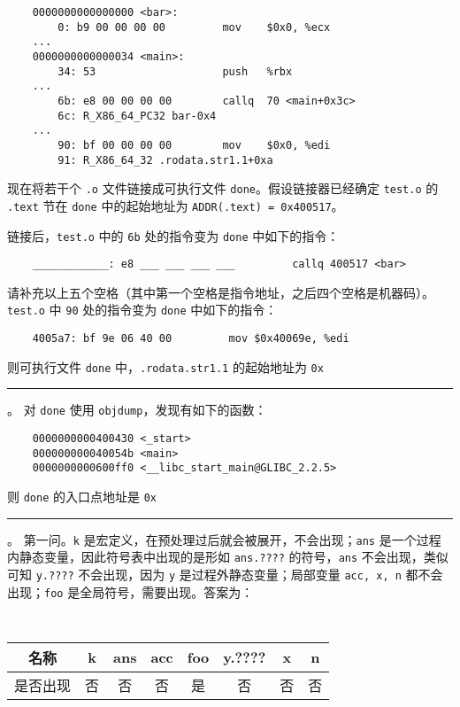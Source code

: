 \begin{problems}
        \begin{verbatim}
    0000000000000000 <bar>:
        0: b9 00 00 00 00         mov    $0x0, %ecx
    ...
    0000000000000034 <main>:
        34: 53                    push   %rbx
    ...
        6b: e8 00 00 00 00        callq  70 <main+0x3c>
        6c: R_X86_64_PC32 bar-0x4
    ...
        90: bf 00 00 00 00        mov    $0x0, %edi
        91: R_X86_64_32 .rodata.str1.1+0xa
        \end{verbatim}
        现在将若干个 \verb|.o| 文件链接成可执行文件 \verb|done|。假设链接器已经确定 \verb|test.o| 的 \verb|.text| 节在 \verb|done| 中的起始地址为 \verb|ADDR(.text) = 0x400517|。

        \subqn 链接后，\verb|test.o| 中的 \verb|6b| 处的指令变为 \verb|done| 中如下的指令：
        \begin{verbatim}
    ____________: e8 ___ ___ ___ ___         callq 400517 <bar>
        \end{verbatim}
        请补充以上五个空格（其中第一个空格是指令地址，之后四个空格是机器码）。
        \subqn \verb|test.o| 中 \verb|90| 处的指令变为 \verb|done| 中如下的指令：
        \begin{verbatim}
    4005a7: bf 9e 06 40 00         mov $0x40069e, %edi
        \end{verbatim}
        则可执行文件 \verb|done| 中，\verb|.rodata.str1.1| 的起始地址为 \verb|0x|\rule{2.5cm}{0.25mm}。
        \qn 对 \verb|done| 使用 \verb|objdump|，发现有如下的函数：
        \begin{verbatim}
    0000000000400430 <_start>
    000000000040054b <main>
    0000000000600ff0 <__libc_start_main@GLIBC_2.2.5>
        \end{verbatim}
        则 \verb|done| 的入口点地址是 \verb|0x|\rule{2.5cm}{0.25mm}。
        \sol 第一问。\verb|k| 是宏定义，在预处理过后就会被展开，不会出现；\verb|ans| 是一个过程内静态变量，因此符号表中出现的是形如 \verb|ans.????| 的符号，\verb|ans| 不会出现，类似可知 \verb|y.????| 不会出现，因为 \verb|y| 是过程外静态变量；局部变量 \verb|acc, x, n| 都不会出现；\verb|foo| 是全局符号，需要出现。答案为：
        \begin{table}[H]
            \tt
            \centering
            \begin{tabular}{|c|c|c|c|c|c|c|c|}
                \hline
                名称 & k & ans & acc & foo & y.???? & x & n \\ \hline
                是否出现 & 否 & 否 & 否 & 是 & 否 & 否 & 否 \\ \hline
            \end{tabular}
        \end{table}


\end{problems}
